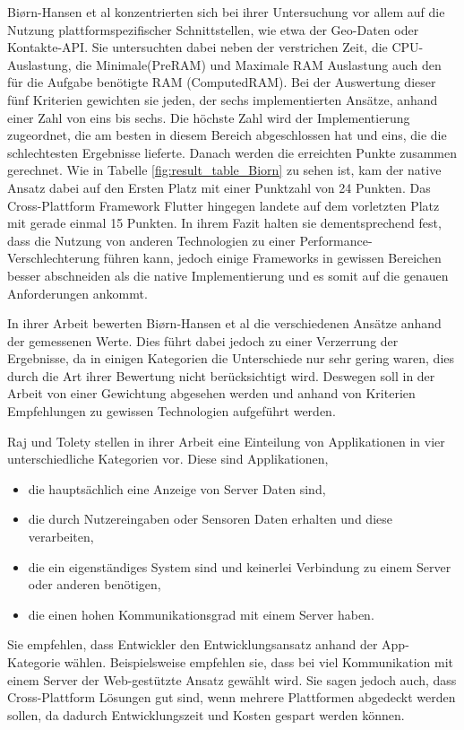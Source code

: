 Biørn-Hansen et al \cite{BirnHansen.2020} konzentrierten sich bei ihrer Untersuchung vor allem auf die Nutzung plattformspezifischer Schnittstellen, wie etwa der Geo-Daten oder Kontakte-API. Sie untersuchten dabei neben der verstrichen Zeit, die CPU-Auslastung, die Minimale(PreRAM) und Maximale RAM Auslastung auch den für die Aufgabe benötigte RAM (ComputedRAM). Bei der Auswertung dieser fünf Kriterien gewichten sie jeden, der sechs implementierten Ansätze, anhand einer Zahl von eins bis sechs. Die höchste Zahl wird der Implementierung zugeordnet, die am besten in diesem Bereich abgeschlossen hat und eins, die die schlechtesten Ergebnisse lieferte. Danach werden die erreichten Punkte zusammen gerechnet. Wie in Tabelle \ref{fig:result_table_Biorn} zu sehen ist, kam der native Ansatz dabei auf den Ersten Platz mit einer Punktzahl von 24 Punkten. Das Cross-Plattform Framework Flutter hingegen landete auf dem vorletzten Platz mit gerade einmal 15 Punkten. In ihrem Fazit halten sie dementsprechend fest, dass die Nutzung von anderen Technologien zu einer Performance-Verschlechterung führen kann, jedoch einige Frameworks in gewissen Bereichen besser abschneiden als die native Implementierung und es somit auf die genauen Anforderungen ankommt.

In ihrer Arbeit bewerten Biørn-Hansen et al \cite{BirnHansen.2020} die verschiedenen Ansätze anhand der gemessenen Werte. Dies führt dabei jedoch zu einer Verzerrung der Ergebnisse, da in einigen Kategorien die Unterschiede nur sehr gering waren, dies durch die Art ihrer Bewertung nicht berücksichtigt wird. Deswegen soll in der Arbeit von einer Gewichtung abgesehen werden und anhand von Kriterien Empfehlungen zu gewissen Technologien aufgeführt werden.

Raj und Tolety \cite{IEEE_Rahul_Seshu} stellen in ihrer Arbeit eine Einteilung von Applikationen in vier unterschiedliche Kategorien vor. Diese sind Applikationen,
\begin{itemize}
    \item die hauptsächlich eine Anzeige von Server Daten sind,
    \item die durch Nutzereingaben oder Sensoren Daten erhalten und diese verarbeiten,
    \item die ein eigenständiges System sind und keinerlei Verbindung zu einem Server oder anderen benötigen,
    \item die einen hohen Kommunikationsgrad mit einem Server haben.
\end{itemize}
Sie empfehlen, dass Entwickler den Entwicklungsansatz anhand der App-Kategorie wählen. Beispielsweise empfehlen sie, dass bei viel Kommunikation mit einem Server der Web-gestützte Ansatz gewählt wird. Sie sagen jedoch auch, dass Cross-Plattform Lösungen gut sind, wenn mehrere Plattformen abgedeckt werden sollen, da dadurch Entwicklungszeit und Kosten gespart werden können.

